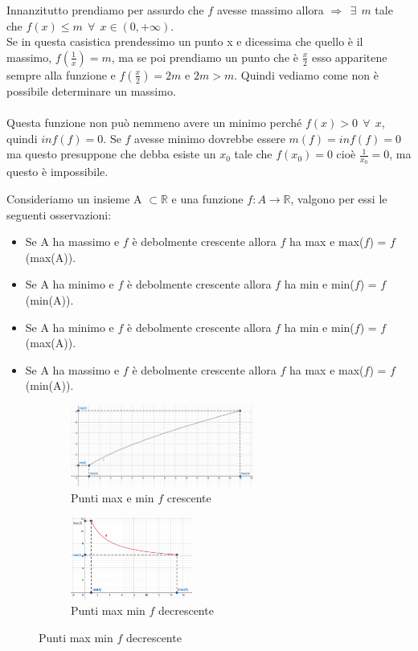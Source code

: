 Innanzitutto prendiamo per assurdo che $f$ avesse massimo allora $\Longrightarrow \: \: \exists \: \: m$ tale che $f(x) \leq m \: \: \forall \: \: x \in (0, +\infty)$. \\ Se in questa casistica prendessimo un punto x e dicessima che quello è il massimo, $f(\frac{1}{x}) = m$, ma se poi prendiamo un punto che è $\frac{x}{2}$ esso apparitene sempre alla funzione e $f(\frac{x}{2}) = 2m$ e $2m > m$. Quindi vediamo come non è possibile determinare un massimo.\\ \\
Questa funzione non può nemmeno avere un minimo perché $f(x) > 0 \: \: \forall \: \: x$, quindi $inf(f) = 0$. Se $f$ avesse minimo dovrebbe essere $m(f) = inf(f) = 0$ ma questo presuppone che debba esiste un $x_0$ tale che $f(x_0) = 0$ cioè $\frac{1}{x_0} = 0$, ma questo è impossibile.\\
\begin{observation}
    Consideriamo un insieme A $\subset \mathbb{R}$ e una funzione $f: A \longrightarrow \mathbb{R}$, valgono per essi le seguenti osservazioni:
    \begin{itemize}
        \item Se A ha massimo e $f$ è debolmente crescente allora $f$ ha max e max($f$) = $f$(max(A)).
        \item Se A ha minimo e $f$ è debolmente crescente allora $f$ ha min e min($f$) = $f$(min(A)).
        \item Se A ha minimo e $f$ è debolmente crescente allora $f$ ha min e min($f$) = $f$(max(A)).
        \item Se A ha massimo e $f$ è debolmente crescente allora $f$ ha max e max($f$) = $f$(min(A)).
    \end{itemize}
\end{observation}
\begin{figure}[h!]
    \begin{subfigure}{.5\textwidth}
        \centering
        \includegraphics[width=6cm]{images/crescente-max-min.png}
        \caption{Punti max e min $f$ crescente}
        \label{fig:my_label}
    \end{subfigure}
    \begin{subfigure}{.5\textwidth}
        \centering
        \includegraphics[width=4cm]{images/descrescente-max-min.png}
        \caption{Punti max min $f$ decrescente}
        \label{fig:my_label}
    \end{subfigure}
\end{figure}
